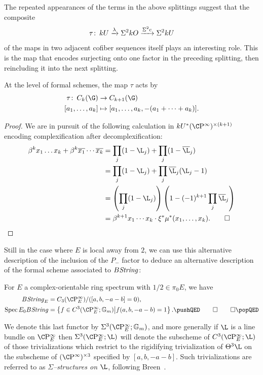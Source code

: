 The repeated appearances of the terms in the above splittings suggest that the composite \[\tau\colon\thinspace kU \xrightarrow{\lambda} \Sigma^2 kO \xrightarrow{\Sigma^2 c} \Sigma^2 kU\] of the maps in two adjacent cofiber sequences itself plays an interesting role.
This is the map that encodes surjecting onto one factor in the preceding splitting, then reincluding it into the next splitting.
\begin{lemma}
At the level of formal schemes, the map \(\tau\) acts by
\begin{align*}
\tau\co C_k(\G) & \to C_{k+1}(\G) \\
[a_1, \ldots, a_k] & \mapsto [a_1, \ldots, a_k, -(a_1 + \cdots + a_k)].
\end{align*}
\end{lemma}
\begin{proof}
We are in pursuit of the following calculation in \(kU^* (\CP^\infty)^{\times (k+1)}\) encoding complexification after decomplexification:
\begin{align*}
\beta^k x_1 \ldots x_k + \beta^k \overline{x_1} \cdots \overline{x_k} & = \prod_j (1 - \L_j) + \prod_j (1 - \overline \L_j) \\
& = \prod_j (1 - \L_j) + \prod_j \overline \L_j (\L_j - 1) \\
& = \left(\prod_j (1 - \L_j)\right) \left(1 - (-1)^{k+1} \prod_j \overline \L_j\right) \\
& = \beta^{k+1} x_1 \cdots x_k \cdot \xi^* \mu^*(x_1, \ldots, x_k). \qedhere
\end{align*}
\end{proof}
Still in the case where \(E\) is local away from \(2\), we can use this alternative description of the inclusion of the \(P_-\) factor to deduce an alternative description of the formal scheme associated to \(B\mathit{String}\):
\begin{corollary}
For \(E\) a complex-orientable ring spectrum with \(1/2 \in \pi_0 E\), we have
\begin{align*}
B\String_E & = C_3(\CP^\infty_E) / ([a, b, -a-b] = 0), \\
\Spec E_0 B\String & = \left\{ f \in C^3(\CP^\infty_E; \Gm) \middle| f(a, b, -a-b) = 1 \right\}. \pushQED\qed\qedhere\popQED
\end{align*}
\end{corollary}

\begin{definition}
We denote this last functor by \(\Sigma^3(\CP^\infty_E; \Gm)\), and more generally if \(\L\) is a line bundle on \(\CP^\infty_E\) then \(\Sigma^3(\CP^\infty_E; \L)\) will denote the subscheme of \(C^3(\CP^\infty_E; \L)\) of those trivializations which restrict to the rigidifying trivialization of \(\Theta^3 \L\) on the subscheme of \((\CP^\infty)^{\times 3}\) specified by \([a, b, -a-b]\).
Such trivializations are referred to as \textit{\(\Sigma\)--structures on \(\L\)}, following Breen~\cite[Section 5]{Breen}.
\end{definition}

